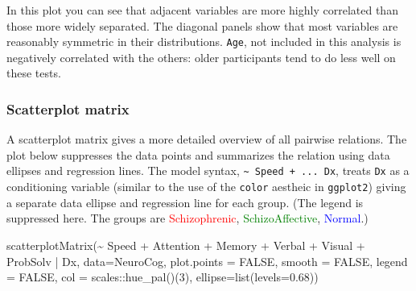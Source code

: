 \documentclass[
  letterpaper,
  10pt,
  krantz2]{krantz}
\makeatletter
\newenvironment{Shaded}{\begin{snugshade}}{\end{snugshade}}
\newcommand{\AttributeTok}[1]{\textcolor[rgb]{0.40,0.45,0.13}{#1}}
\newcommand{\ConstantTok}[1]{\textcolor[rgb]{0.56,0.35,0.01}{#1}}
\newcommand{\DecValTok}[1]{\textcolor[rgb]{0.68,0.00,0.00}{#1}}
\newcommand{\FloatTok}[1]{\textcolor[rgb]{0.68,0.00,0.00}{#1}}
\newcommand{\FunctionTok}[1]{\textcolor[rgb]{0.28,0.35,0.67}{#1}}
\newcommand{\NormalTok}[1]{\textcolor[rgb]{0.00,0.23,0.31}{#1}}
\newcommand{\SpecialCharTok}[1]{\textcolor[rgb]{0.37,0.37,0.37}{#1}}
\newenvironment{kframe}{%
  \medskip{}
  \setlength{\fboxsep}{.8em}
  \def\at@end@of@kframe{}%
  \ifinner\ifhmode%
  \def\at@end@of@kframe{\end{minipage}}%
  \begin{minipage}{\columnwidth}%
  \fi\fi%
  \def\FrameCommand##1{\hskip\@totalleftmargin \hskip-\fboxsep
  \colorbox{shadecolor}{##1}\hskip-\fboxsep
      \hskip-\linewidth \hskip-\@totalleftmargin \hskip\columnwidth}%
  \MakeFramed {\advance\hsize-\width
    \@totalleftmargin\z@ \linewidth\hsize
    \@setminipage}}%
{\par\unskip\endMakeFramed%
  \at@end@of@kframe}
\renewenvironment{Shaded}{\begin{kframe}}{\end{kframe}}
\makeatother
\begin{document}
In this plot you can see that adjacent variables are more highly
correlated than those more widely separated. The diagonal panels show
that most variables are reasonably symmetric in their distributions.
\texttt{Age}, not included in this analysis is negatively correlated
with the others: older participants tend to do less well on these tests.

\subsubsection*{Scatterplot matrix}\label{scatterplot-matrix}

A scatterplot matrix gives a more detailed overview of all pairwise
relations. The plot below suppresses the data points and summarizes the
relation using data ellipses and regression lines. The model syntax,
\texttt{\textasciitilde{}\ Speed\ +\ ...\ \textbar{}Dx}, treats
\texttt{Dx} as a conditioning variable (similar to the use of the
\texttt{color} aestheic in \texttt{ggplot2}) giving a separate data
ellipse and regression line for each group. (The legend is suppressed
here. The groups are \textcolor{red}{Schizophrenic},
\textcolor{green}{SchizoAffective}, \textcolor{blue}{Normal}.)

\begin{Shaded}
\begin{Highlighting}[]
\FunctionTok{scatterplotMatrix}\NormalTok{(}\SpecialCharTok{\textasciitilde{}}\NormalTok{ Speed }\SpecialCharTok{+}\NormalTok{ Attention }\SpecialCharTok{+}\NormalTok{ Memory }\SpecialCharTok{+}\NormalTok{ Verbal }\SpecialCharTok{+}\NormalTok{ Visual }\SpecialCharTok{+}\NormalTok{ ProbSolv }\SpecialCharTok{|}\NormalTok{ Dx,}
  \AttributeTok{data=}\NormalTok{NeuroCog,}
  \AttributeTok{plot.points =} \ConstantTok{FALSE}\NormalTok{,}
  \AttributeTok{smooth =} \ConstantTok{FALSE}\NormalTok{,}
  \AttributeTok{legend =} \ConstantTok{FALSE}\NormalTok{,}
  \AttributeTok{col =}\NormalTok{ scales}\SpecialCharTok{::}\FunctionTok{hue\_pal}\NormalTok{()(}\DecValTok{3}\NormalTok{),}
  \AttributeTok{ellipse=}\FunctionTok{list}\NormalTok{(}\AttributeTok{levels=}\FloatTok{0.68}\NormalTok{))}
\end{Highlighting}
\end{Shaded}
\end{document}
